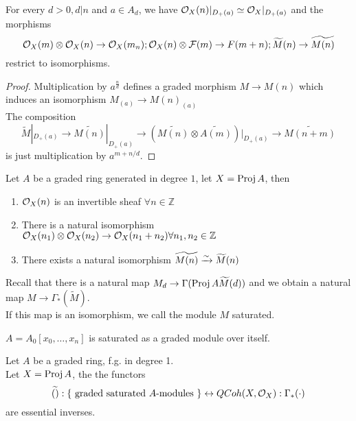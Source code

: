 \documentclass[../main.tex]{subfiles}
\begin{document}
\begin{lemma}
For every $d>0, d|n$ and $a\in A_d$, we have $\mathcal{O}_X( n) |_{D_+( a) } \simeq \mathcal{O}_X|_{D_+( a) } $ and the morphisms
\[ 
	\mathcal{O}_X( m) \otimes \mathcal{O}_X( n) \to \mathcal{O}_X(m_n) ; \mathcal{O}_X( n) \otimes \mathcal{F}( m) \to F( m+n); \widetilde M ( n) \to \widetilde{M( n) }
\]
restrict to isomorphisms.\\

\end{lemma}
\begin{proof}
Multiplication by $a^{\frac{n}{d}}$ defines a graded morphism $M\to M( n) $ which induces an isomorphism $M_{( a) } \to M( n)_{( a) } $\\
The composition
\[ 
	\widetilde{M}|_{D_+( a) } \to \widetilde{M( n) }|_{D_+( a) } \to ( \widetilde{M( n) }\otimes \widetilde{A( m) })|_{D_+( a) } \to \widetilde{M( n+m)}
\]
is just multiplication by $a^{m+n /d}$.
\end{proof}
\begin{crly}
Let $A$ be a graded ring generated in degree $1$, let $X= \operatorname{Proj} A$, then
\begin{enumerate}
\item $\mathcal{O}_X( n) $ is an invertible sheaf $\forall n \in \mathbb{Z}$
\item There is a natural isomorphism $\mathcal{O}_X( n_1) \otimes \mathcal{O}_X( n_2) \to \mathcal{O}_X( n_1+n_2) \forall n_1,n_2 \in \mathbb{Z}$
\item There exists a natural isomorphism $\widetilde{M( n) } \xrightarrow{\sim} \widetilde{M}( n) $ 	
\end{enumerate}
\end{crly}
Recall that there is a natural map $M_d \to \Gamma( \operatorname{Proj} A \widetilde{M}( d) ) $ and we obtain a natural map $M\to \Gamma_\ast( \widetilde{M}) $.\\
If this map is an isomorphism, we call the module $M$ saturated.
\begin{exemple}
	$A= A_0[x_0,\ldots,x_n]$ is saturated as a graded module over itself.
\end{exemple}
\begin{thm}
	Let $A$ be a graded ring, f.g. in degree 1.\\
	Let $X= \operatorname{Proj} A$, the the functors
	\[ 
		\widetilde{( ) }:\left\{ \text{ graded saturated $A$-modules }  \right\} \leftrightarrow QCoh( X,\mathcal{O}_X) : \Gamma_\ast( \cdot) 	
	\]
	are essential inverses.
\end{thm}
\end{document}
